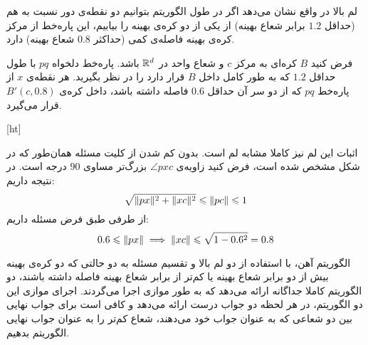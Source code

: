 
لم بالا در واقع نشان می‌دهد اگر در طول الگوریتم بتوانیم دو نقطه‌ی دور نسبت به هم (حداقل $1.2$ برابر شعاع بهینه) از یکی از دو کره‌ی بهینه را بیابیم، این پاره‌خط از مرکز کره‌ی بهینه فاصله‌ی کمی‌ (حداکثر $0.8$ شعاع بهینه) دارد.

فرض کنید $B$ کره‌ای به مرکز $c$ و شعاع واحد در $\mathbb{R}^d$ باشد. پاره‌خط دلخواه $pq$ با طول حداقل $1.2$ که به طور کامل داخل $B$ قرار دارد را در نظر بگیرید. هر نقطه‌ی $x$ از پاره‌خط $pq$ که از دو سر آن حداقل $0.6$ فاصله داشته باشد، داخل کره‌ی $B'(c, 0.8)$ قرار می‌گیرد.


[ht]


اثبات این لم نیز کاملا مشابه لم  است. بدون کم شدن از کلیت  مسئله همان‌طور که در شکل  مشخص شده است، فرض کنید زاویه‌ی $\angle{pxc}$ بزرگ‌تر مساوی $90$ درجه است. در نتیجه داریم:
$$\sqrt{\|{px}\|^2 + \|{xc}\|^2} \leqslant \|{pc}\| \leqslant 1$$
از طرفی طبق فرض مسئله داریم:
$$0.6 \leqslant \|{px}\| \implies \|{xc}\| \leqslant \sqrt{1 - 0.6^2} = 0.8$$


الگوریتم آهن، با استفاده از دو لم بالا و تقسیم مسئله به دو حالتی که دو کره‌ی بهینه بیش از دو برابر شعاع بهینه یا کم‌تر از برابر شعاع بهینه فاصله داشته باشند، دو الگوریتم کاملا جداگانه ارائه می‌دهد که به طور موازی اجرا می‌گردند. اجرای موازی این دو الگوریتم، در هر لحظه دو جواب درست ارائه می‌دهد و کافی است برای جواب نهایی بین دو شعاعی که به عنوان جواب خود می‌دهند، شعاع کم‌تر را به عنوان جواب نهایی الگوریتم بدهیم.

